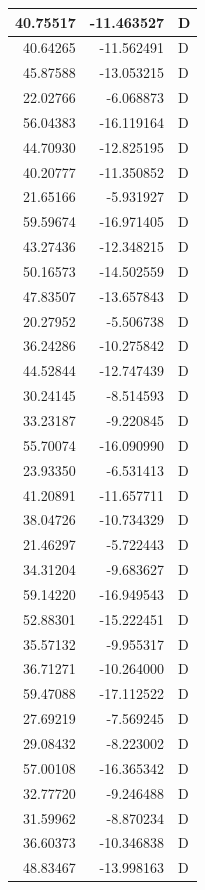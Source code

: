 \documentclass[
  letterpaper,
  DIV=11,
  numbers=noendperiod]{scrartcl}
\begin{document}
\begin{table}
\begin{tabular}[t]{r|r|l}
\hline
40.75517 & -11.463527 & D\\
\hline
40.64265 & -11.562491 & D\\
\hline
45.87588 & -13.053215 & D\\
\hline
22.02766 & -6.068873 & D\\
\hline
56.04383 & -16.119164 & D\\
\hline
44.70930 & -12.825195 & D\\
\hline
40.20777 & -11.350852 & D\\
\hline
21.65166 & -5.931927 & D\\
\hline
59.59674 & -16.971405 & D\\
\hline
43.27436 & -12.348215 & D\\
\hline
50.16573 & -14.502559 & D\\
\hline
47.83507 & -13.657843 & D\\
\hline
20.27952 & -5.506738 & D\\
\hline
36.24286 & -10.275842 & D\\
\hline
44.52844 & -12.747439 & D\\
\hline
30.24145 & -8.514593 & D\\
\hline
33.23187 & -9.220845 & D\\
\hline
55.70074 & -16.090990 & D\\
\hline
23.93350 & -6.531413 & D\\
\hline
41.20891 & -11.657711 & D\\
\hline
38.04726 & -10.734329 & D\\
\hline
21.46297 & -5.722443 & D\\
\hline
34.31204 & -9.683627 & D\\
\hline
59.14220 & -16.949543 & D\\
\hline
52.88301 & -15.222451 & D\\
\hline
35.57132 & -9.955317 & D\\
\hline
36.71271 & -10.264000 & D\\
\hline
59.47088 & -17.112522 & D\\
\hline
27.69219 & -7.569245 & D\\
\hline
29.08432 & -8.223002 & D\\
\hline
57.00108 & -16.365342 & D\\
\hline
32.77720 & -9.246488 & D\\
\hline
31.59962 & -8.870234 & D\\
\hline
36.60373 & -10.346838 & D\\
\hline
48.83467 & -13.998163 & D\\

\end{tabular}
\end{table}
\end{document}
